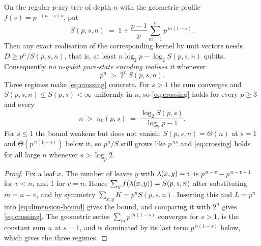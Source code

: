 \begin{corollary}
  \label{cor:no-n-qubit}
  On the regular $p$-ary tree of depth $n$ with the geometric profile
  $f(v) = p^{-(n-v)s}$, put
  \begin{equation}
    \label{eq:row-sum}
    S(p, s, n) \;=\; 1 + \frac{p-1}{p} \sum_{m=1}^{n} p^{\,m(1-s)} .
  \end{equation}
  Then any exact realisation of the corresponding kernel by unit vectors needs
  $D \ge p^{n} / S(p,s,n)$, that is, at least $n \log_2 p - \log_2 S(p,s,n)$ qubits.
  Consequently \emph{no $n$-qubit pure-state encoding realises it} whenever
  \begin{equation}
    \label{eq:crossing}
    p^{n} \;>\; 2^{n}\, S(p,s,n) .
  \end{equation}
  Three regimes make \cref{eq:crossing} concrete. For $s > 1$ the sum converges and
  $S(p,s,n) \le S(p,s) < \infty$ uniformly in $n$, so \cref{eq:crossing} holds for
  every $p \ge 3$ and every
  \begin{equation}
    \label{eq:crossing-threshold}
    n \;>\; n_0(p, s) \;=\; \frac{\log_2 S(p,s)}{\log_2 p - 1} .
  \end{equation}
  For $s \le 1$ the bound weakens but does not vanish: $S(p,s,n) = \Theta(n)$ at
  $s = 1$ and $\Theta(p^{\,n(1-s)})$ below it, so $p^{n}/S$ still grows like
  $p^{\,ns}$ and \cref{eq:crossing} holds for all large $n$ whenever
  $s > \log_p 2$.
\end{corollary}

\begin{proof}
  Fix a leaf $x$. The number of leaves $y$ with $\lambda(x,y) = v$ is
  $p^{\,n-v} - p^{\,n-v-1}$ for $v < n$, and $1$ for $v = n$. Hence
  $\sum_{y} f(\lambda(x,y)) = S(p,s,n)$ after substituting $m = n - v$, and by
  symmetry $\sum_{x,y} K = p^{n} S(p,s,n)$. Inserting this and $L = p^{n}$ into
  \cref{eq:dimension-bound} gives the bound, and comparing it with $2^{n}$ gives
  \cref{eq:crossing}. The geometric series $\sum_m p^{\,m(1-s)}$ converges for
  $s > 1$, is the constant sum $n$ at $s = 1$, and is dominated by its last term
  $p^{\,n(1-s)}$ below, which gives the three regimes.
\end{proof}

